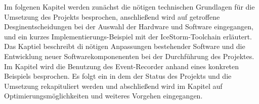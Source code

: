 Im folgenen Kapitel  werden zunächst die nötigen technischen Grundlagen für die Umsetzung des Projekts besprochen, anschließend wird auf getroffene Desginentscheidungen bei der Auswahl der Hardware und Software eingegangen, und ein kurzes Implementierungs-Beispiel mit der IceStorm-Toolchain erläutert.
Das Kaptiel  beschreibt di nötigen Anpassungen bestehender Software und die Entwicklung neuer Softwarekomponenenten bei der Durchführung des Projektes.
Im Kapitel  wird die Benutzung des Event-Recorder anhand eines konkreten Beispiels besprochen.
Es folgt ein  in dem der Status des Projekts und die Umsetzung rekapituliert werden und abschließend wird im Kapitel  auf Optimierungsmöglichkeiten und weiteres Vorgehen eingegangen.





